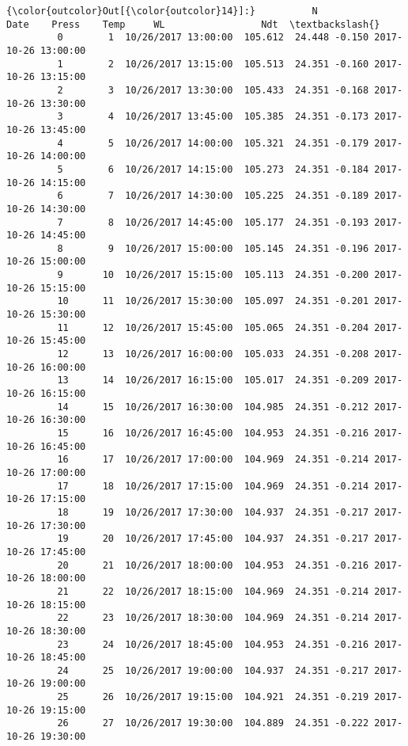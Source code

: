 \documentclass[11pt]{article}
\begin{document}
\begin{Verbatim}[commandchars=\\\{\}]
{\color{outcolor}Out[{\color{outcolor}14}]:}          N                 Date    Press    Temp     WL                 Ndt  \textbackslash{}
         0        1  10/26/2017 13:00:00  105.612  24.448 -0.150 2017-10-26 13:00:00   
         1        2  10/26/2017 13:15:00  105.513  24.351 -0.160 2017-10-26 13:15:00   
         2        3  10/26/2017 13:30:00  105.433  24.351 -0.168 2017-10-26 13:30:00   
         3        4  10/26/2017 13:45:00  105.385  24.351 -0.173 2017-10-26 13:45:00   
         4        5  10/26/2017 14:00:00  105.321  24.351 -0.179 2017-10-26 14:00:00   
         5        6  10/26/2017 14:15:00  105.273  24.351 -0.184 2017-10-26 14:15:00   
         6        7  10/26/2017 14:30:00  105.225  24.351 -0.189 2017-10-26 14:30:00   
         7        8  10/26/2017 14:45:00  105.177  24.351 -0.193 2017-10-26 14:45:00   
         8        9  10/26/2017 15:00:00  105.145  24.351 -0.196 2017-10-26 15:00:00   
         9       10  10/26/2017 15:15:00  105.113  24.351 -0.200 2017-10-26 15:15:00   
         10      11  10/26/2017 15:30:00  105.097  24.351 -0.201 2017-10-26 15:30:00   
         11      12  10/26/2017 15:45:00  105.065  24.351 -0.204 2017-10-26 15:45:00   
         12      13  10/26/2017 16:00:00  105.033  24.351 -0.208 2017-10-26 16:00:00   
         13      14  10/26/2017 16:15:00  105.017  24.351 -0.209 2017-10-26 16:15:00   
         14      15  10/26/2017 16:30:00  104.985  24.351 -0.212 2017-10-26 16:30:00   
         15      16  10/26/2017 16:45:00  104.953  24.351 -0.216 2017-10-26 16:45:00   
         16      17  10/26/2017 17:00:00  104.969  24.351 -0.214 2017-10-26 17:00:00   
         17      18  10/26/2017 17:15:00  104.969  24.351 -0.214 2017-10-26 17:15:00   
         18      19  10/26/2017 17:30:00  104.937  24.351 -0.217 2017-10-26 17:30:00   
         19      20  10/26/2017 17:45:00  104.937  24.351 -0.217 2017-10-26 17:45:00   
         20      21  10/26/2017 18:00:00  104.953  24.351 -0.216 2017-10-26 18:00:00   
         21      22  10/26/2017 18:15:00  104.969  24.351 -0.214 2017-10-26 18:15:00   
         22      23  10/26/2017 18:30:00  104.969  24.351 -0.214 2017-10-26 18:30:00   
         23      24  10/26/2017 18:45:00  104.953  24.351 -0.216 2017-10-26 18:45:00   
         24      25  10/26/2017 19:00:00  104.937  24.351 -0.217 2017-10-26 19:00:00   
         25      26  10/26/2017 19:15:00  104.921  24.351 -0.219 2017-10-26 19:15:00   
         26      27  10/26/2017 19:30:00  104.889  24.351 -0.222 2017-10-26 19:30:00   

\end{Verbatim}
\end{document}
